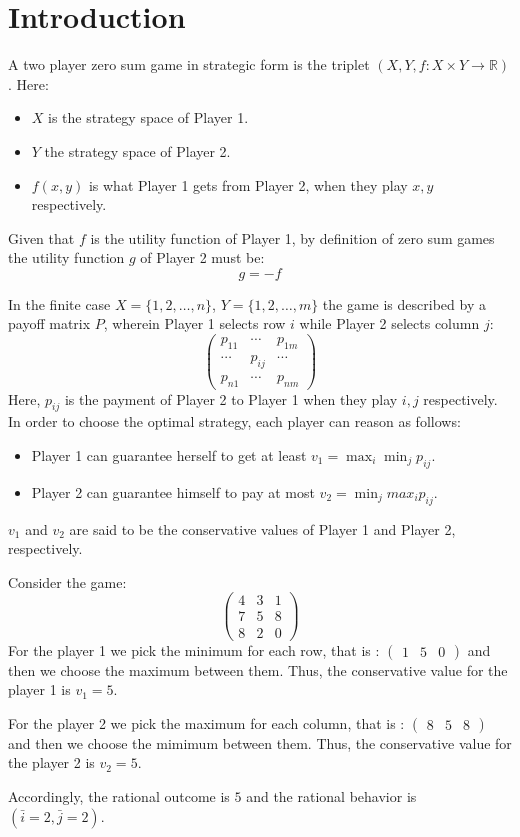 \section{Introduction}

\begin{definition}
    A two player zero sum game in strategic form is the triplet $(X, Y , f : X \times Y \rightarrow \mathbb{R})$. 
    Here: 
    \begin{itemize}
        \item $X$ is the strategy space of Player 1.
        \item $Y$ the strategy space of Player 2.
        \item $f (x, y)$ is what Player 1 gets from Player 2, when they play $x, y$ respectively.
    \end{itemize}
\end{definition}
Given that $f$ is the utility function of Player 1, by definition of zero sum games the utility function $g$ of Player 2 must be: 
\[g=-f\]

In the finite case $X = \{1, 2, \dots, n\}$, $Y = \{1, 2, \dots, m\}$ the game is described by a payoff matrix $P$, wherein Player 1 selects row $i$ while Player 2 selects column $j$:
\[\begin{pmatrix} p_{11} & \cdots & p_{1m} \\ \cdots & p_{ij} & \cdots \\ p_{n1} & \cdots & p_{nm} \end{pmatrix}\]
Here, $p_{ij}$ is the payment of Player 2 to Player 1 when they play $i, j$ respectively.
In order to choose the optimal strategy, each player can reason as follows:
\begin{itemize}
    \item Player 1 can guarantee herself to get at least $v_1 = \max_i \min_j p_{ij}$. 
    \item Player 2 can guarantee himself to pay at most $v_2 = \min_j max_i p_{ij}$. 
\end{itemize}
$v_1$ and $v_2$ are said to be the conservative values of Player 1 and Player 2, respectively.
\begin{example}
    Consider the game: 
    \[\begin{pmatrix} 4 & 3 & 1 \\ 7 & 5 & 8 \\ 8 & 2 & 0 \end{pmatrix}\]
    For the player 1 we pick the minimum for each row, that is : $\begin{pmatrix} 1 & 5 & 0 \end{pmatrix}$ and then we choose the maximum between them.
    Thus, the conservative value for the player 1 is $v_1=5$. 

    For the player 2 we pick the maximum for each column, that is : $\begin{pmatrix} 8 & 5 & 8 \end{pmatrix}$ and then we choose the mimimum between them.
    Thus, the conservative value for the player 2 is $v_2=5$. 

    Accordingly, the rational outcome is $5$ and the rational behavior is $( \bar{i} = 2, \bar{j} = 2 )$.
\end{example}

